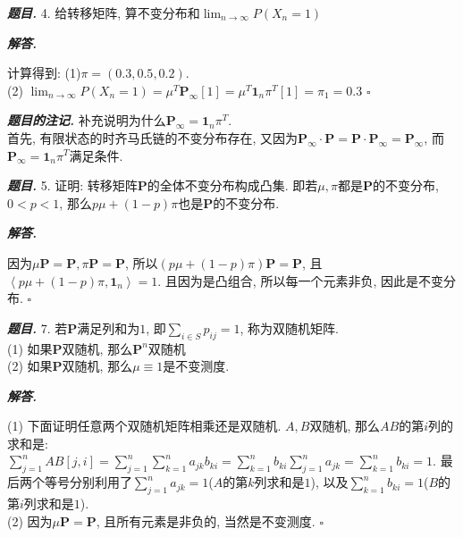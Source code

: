 \documentclass[10pt, a4paper, oneside]{ctexart}
\newenvironment{problem}{\begin{framed}\par\noindent\textbf{\textit{题目. }}}{\end{framed}\par}
\newenvironment{solution}{%
  \par\noindent\textbf{\textit{解答. }}\ignorespaces
}{%
  \hfill\ensuremath{\square}\par %
}
\newenvironment{note}{\par\noindent\textbf{\textit{题目的注记. }}\ignorespaces}{\par}
\begin{document}
\begin{problem}
    4. 给转移矩阵, 算不变分布和$\lim_{n\to\infty}P(X_n=1)$
\end{problem}
\begin{solution}
    计算得到: (1)$\pi=(0.3,0.5,0.2)$. \\(2) $\lim_{n\to \infty}P(X_n=1)=\mu^T\mathbf{P}_{\infty}[1]=\mu^T\mathbf{1}_n\pi^T[1]=\pi_1=0.3$
\end{solution}
\begin{note}
    补充说明为什么$\mathbf{P}_{\infty}=\mathbf{1}_n\pi^T$.\\
    首先, 有限状态的时齐马氏链的不变分布存在, 又因为$\mathbf{P}_{\infty}\cdot \mathbf{P}=\mathbf{P}\cdot \mathbf{P}_{\infty}=\mathbf{P}_{\infty}$, 而$\mathbf{P}_{\infty}=\mathbf{1}_n\pi^T$满足条件.
\end{note}

\begin{problem}
5. 证明: 转移矩阵$\mathbf{P}$的全体不变分布构成凸集. 即若$\mu,\pi$都是$\mathbf{P}$的不变分布,$0<p<1$, 那么$p\mu+(1-p)\pi$也是$\mathbf{P}$的不变分布.
\end{problem}
\begin{solution}
因为$\mu\mathbf{P}=\mathbf{P}, \pi\mathbf{P}=\mathbf{P}$, 所以$(p\mu+(1-p)\pi)\mathbf{P}=\mathbf{P}$, 且$\left\langle p\mu+(1-p)\pi, \mathbf{1}_n \right\rangle=1$. 且因为是凸组合, 所以每一个元素非负, 因此是不变分布.
\end{solution}

\begin{problem}
    7. 若$\mathbf{P}$满足列和为$1$, 即$\sum_{i\in S}p_{ij}=1$, 称为双随机矩阵.\\
(1) 如果$\mathbf{P}$双随机, 那么$\mathbf{P}^n$双随机\\
(2) 如果$\mathbf{P}$双随机, 那么$\mu\equiv 1$是不变测度.
\end{problem}
\begin{solution}
(1) 下面证明任意两个双随机矩阵相乘还是双随机. $A,B$双随机, 那么$AB$的第$i$列的求和是: $\sum_{j=1}^n AB[j,i]=\sum_{j=1}^n \sum_{k=1}^n a_{jk}b_{ki}=\sum_{k=1}^n b_{ki}\sum_{j=1}^n a_{jk}=\sum_{k=1}^n b_{ki}=1$. 最后两个等号分别利用了$\sum_{j=1}^n a_{jk}=1$($A$的第$k$列求和是$1$), 以及$\sum_{k=1}^n b_{ki}=1$($B$的第$i$列求和是$1$).\\
(2) 因为$\mu \mathbf{P}=\mathbf{P}$, 且所有元素是非负的, 当然是不变测度.
\end{solution}
\end{document}

